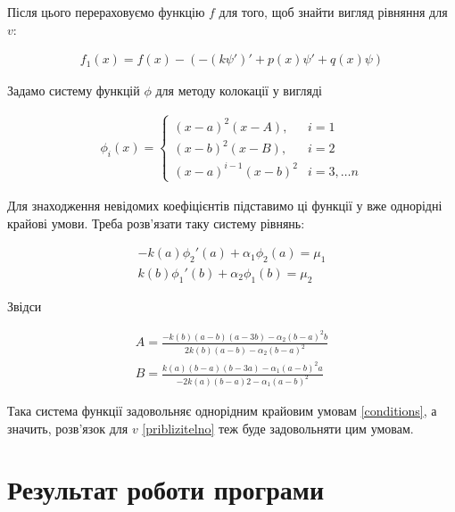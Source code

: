 Після цього перераховуємо функцію  $f$ для того, щоб знайти вигляд рівняння для $v$:
	
	\begin{equation}
	\begin{split}
	f_1(x) = f(x) - \left( -(k\psi')' + p(x)\psi' + q(x)\psi \right)
	\end{split}
	\end{equation}
	
Задамо систему функцій $\phi$ для методу колокації у вигляді 

	\begin{align}
	\phi_i(x) = 
	\begin{cases}
	(x - a)^2(x - A), & i = 1 \\ 
	(x - b)^2(x - B), & i = 2 \\
	(x - a)^{i -1}(x - b)^2 & i = 3, \dots n
	\end{cases}
	\end{align}

Для знаходження невідомих коефіцієнтів підставимо ці функції у вже однорідні крайові умови. Треба розв'язати таку систему рівнянь: 
	
	\begin{equation}
	\begin{split}
	-k(a)\phi_2'(a) + \alpha_1 \phi_2(a) = \mu_1 \\ 
	k(b)\phi_1'(b) + \alpha_2 \phi_1(b) = \mu_2
	\end{split}
	\end{equation}
	
Звідси

	\begin{equation}
	\begin{split}
	A = \frac{-k(b)(a-b)(a-3b) - \alpha_2(b-a)^2b}{2k(b)(a-b) - \alpha_2(b-a)^2} \\
	B = \frac{k(a)(b-a)(b-3a) - \alpha_1(a-b)^2a}{-2k(a)(b-a)2 - \alpha_1(a-b)^2}
	\end{split}
	\end{equation}

Така система функції задовольняє однорідним крайовим умовам \ref{conditions}, а значить, розв'язок для $v$ \ref{priblizitelno} теж буде задовольняти цим умовам.




\section{Результат роботи програми}

